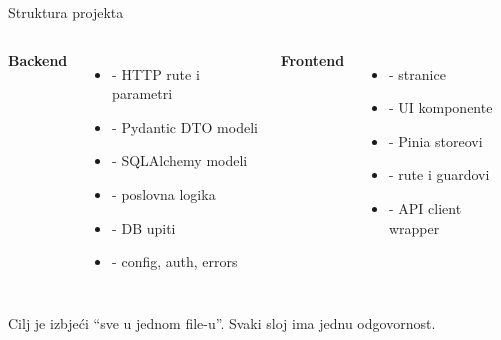 \begin{frame}{Struktura projekta}
\begin{columns}[T]
\textbf{Backend}
\begin{itemize}
  \item {} - HTTP rute i parametri
  \item {} - Pydantic DTO modeli
  \item {} - SQLAlchemy modeli
  \item {} - poslovna logika
  \item {} - DB upiti
  \item {} - config, auth, errors
\end{itemize}

\textbf{Frontend}
\begin{itemize}
  \item {} - stranice
  \item {} - UI komponente
  \item {} - Pinia storeovi
  \item {} - rute i guardovi
  \item {} - API client wrapper
\end{itemize}
\end{columns}

\vspace{0.4em}
Cilj je izbjeći \enquote{sve u jednom file-u}. Svaki sloj ima jednu odgovornost.
\end{frame}

